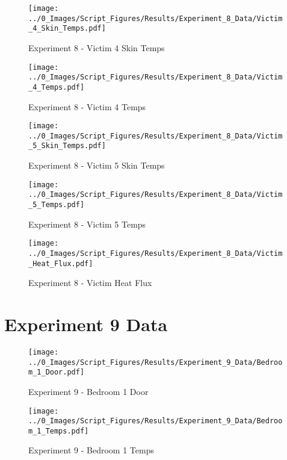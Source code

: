 	\clearpage

	\begin{figure}[H]
		\centering
		\texttt{[image: ../0\_Images/Script\_Figures/Results/Experiment\_8\_Data/Victim\_4\_Skin\_Temps.pdf]}
		\caption[]{Experiment 8 - Victim 4 Skin Temps}
	\end{figure}
 

	\begin{figure}[H]
		\centering
		\texttt{[image: ../0\_Images/Script\_Figures/Results/Experiment\_8\_Data/Victim\_4\_Temps.pdf]}
		\caption[]{Experiment 8 - Victim 4 Temps}
	\end{figure}
 
	\clearpage

	\begin{figure}[H]
		\centering
		\texttt{[image: ../0\_Images/Script\_Figures/Results/Experiment\_8\_Data/Victim\_5\_Skin\_Temps.pdf]}
		\caption[]{Experiment 8 - Victim 5 Skin Temps}
	\end{figure}
 

	\begin{figure}[H]
		\centering
		\texttt{[image: ../0\_Images/Script\_Figures/Results/Experiment\_8\_Data/Victim\_5\_Temps.pdf]}
		\caption[]{Experiment 8 - Victim 5 Temps}
	\end{figure}
 
	\clearpage

	\begin{figure}[H]
		\centering
		\texttt{[image: ../0\_Images/Script\_Figures/Results/Experiment\_8\_Data/Victim\_Heat\_Flux.pdf]}
		\caption[]{Experiment 8 - Victim Heat Flux}
	\end{figure}
 

\clearpage		\large
\section{Experiment 9 Data} \label{App:Exp9Results} 

	\begin{figure}[H]
		\centering
		\texttt{[image: ../0\_Images/Script\_Figures/Results/Experiment\_9\_Data/Bedroom\_1\_Door.pdf]}
		\caption[]{Experiment 9 - Bedroom 1 Door}
	\end{figure}
 

	\begin{figure}[H]
		\centering
		\texttt{[image: ../0\_Images/Script\_Figures/Results/Experiment\_9\_Data/Bedroom\_1\_Temps.pdf]}
		\caption[]{Experiment 9 - Bedroom 1 Temps}
	\end{figure}
 
